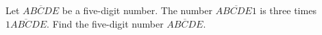 Let $\overline{ABCDE}$ be a five-digit number. The number $\overline{ABCDE1}$ is three times $\overline{1ABCDE}$. Find the five-digit number $\overline{ABCDE}$.
